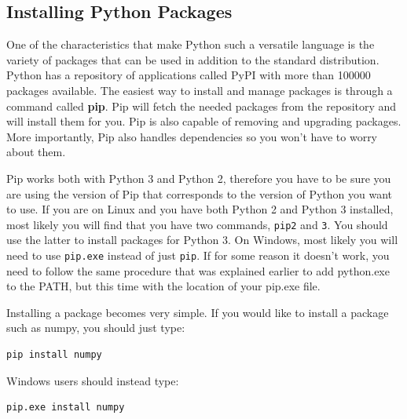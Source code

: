 \subsection{Installing Python Packages}
One of the characteristics that make Python such a versatile language is the variety of packages that can be used in addition to the standard distribution. Python has a repository of applications called PyPI with more than 100000 packages available. The easiest way to install and manage packages is through a command called \textbf{pip}. Pip will fetch the needed packages from the repository and will install them for you. Pip is also capable of removing and upgrading packages. More importantly, Pip also handles dependencies so you won’t have to worry about them.

Pip works both with Python 3 and Python 2, therefore you have to be sure you are using the version of Pip that corresponds to the version of Python you want to use. If you are on Linux and you have both Python 2 and Python 3 installed, most likely you will find that you have two commands, \texttt{pip2} and \texttt{3}. You should use the latter to install packages for Python 3. On Windows, most likely you will need to use \texttt{pip.exe} instead of just \texttt{pip}. If for some reason it doesn't work, you need to follow the same procedure that was explained earlier to add python.exe to the PATH, but this time with the location of your pip.exe file.



Installing a package becomes very simple. If you would like to install a package such as numpy, you should just type:
\begin{verbatim}
pip install numpy
\end{verbatim}

Windows users should instead type:
\begin{verbatim}
pip.exe install numpy
\end{verbatim}


